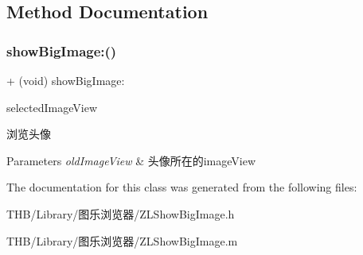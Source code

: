 \subsection{Method Documentation}
\mbox{\label{interface_z_l_show_big_image_a09ca29c6b7eeece884d5fc773a0c3118}} 
\subsubsection{\texorpdfstring{show\+Big\+Image\+:()}{showBigImage:()}}
{\footnotesize\ttfamily + (void) show\+Big\+Image\+: \begin{DoxyParamCaption}\item[{(U\+I\+Image\+View $\ast$)}]{selected\+Image\+View }\end{DoxyParamCaption}}



浏览头像 


\begin{DoxyParams}{Parameters}
{\em old\+Image\+View} & 头像所在的image\+View \\
\hline
\end{DoxyParams}


The documentation for this class was generated from the following files\+:\begin{DoxyCompactItemize}
\item 
T\+H\+B/\+Library/图乐浏览器/Z\+L\+Show\+Big\+Image.\+h\item 
T\+H\+B/\+Library/图乐浏览器/Z\+L\+Show\+Big\+Image.\+m\end{DoxyCompactItemize}
